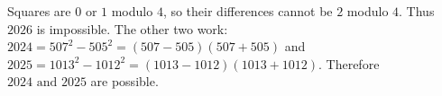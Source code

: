 Squares are $0$ or $1$ modulo $4$, so their differences cannot be $2$ modulo $4$. Thus $2026$ is impossible. The other two work: $2024=507^2-505^2=(507-505)(507+505)$ and $2025=1013^2-1012^2=(1013-1012)(1013+1012)$. Therefore $\boxed{2024\text{ and }2025}$ are possible.

